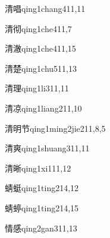 \begin{verbete}{清唱}{qing1chang4}{11,11}
\end{verbete}

\begin{verbete}{清彻}{qing1che4}{11,7}
\end{verbete}

\begin{verbete}{清澈}{qing1che4}{11,15}
\end{verbete}

\begin{verbete}{清楚}{qing1chu5}{11,13}
\end{verbete}

\begin{verbete}{清理}{qing1li3}{11,11}
\end{verbete}

\begin{verbete}{清凉}{qing1liang2}{11,10}
\end{verbete}

\begin{verbete}{清明节}{qing1ming2jie2}{11,8,5}
\end{verbete}

\begin{verbete}{清爽}{qing1shuang3}{11,11}
\end{verbete}

\begin{verbete}{清晰}{qing1xi1}{11,12}
\end{verbete}

\begin{verbete}{蜻蜓}{qing1ting2}{14,12}
\end{verbete}

\begin{verbete}{蜻蝏}{qing1ting2}{14,15}
\end{verbete}

\begin{verbete}{情感}{qing2gan3}{11,13}
\end{verbete}

